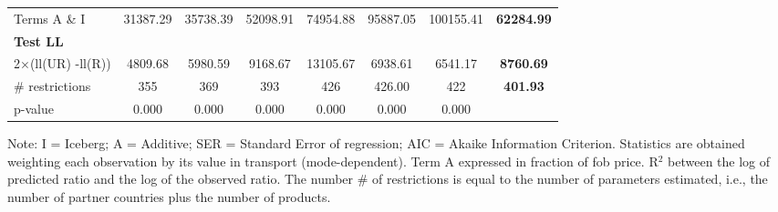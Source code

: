 \documentclass[a4paper,11pt]{article}
\begin{document}
\begin{table}[htbp]
\begin{center}
\begin{tabular}{lccccccc}
Terms A \& I & 31387.29 & 35738.39 & 52098.91 & 74954.88 & \multicolumn{1}{c}{95887.05} & \multicolumn{1}{c}{100155.41} & \multicolumn{1}{c}{\textbf{62284.99}} \\
\textbf{Test LL} &       &       &       &       & \multicolumn{1}{c}{} &       &  \\
2$\times$(ll(UR) -ll(R)) & 4809.68 & 5980.59 & 9168.67 & 13105.67 & \multicolumn{1}{c}{6938.61} & \multicolumn{1}{c}{6541.17} & \multicolumn{1}{c}{\textbf{8760.69}} \\
\# restrictions  & 355   & 369   & 393   & 426   & \multicolumn{1}{c}{426.00} & \multicolumn{1}{c}{422} & \multicolumn{1}{c}{\textbf{401.93}} \\
p-value & 0.000 & 0.000 & 0.000 & 0.000 & \multicolumn{1}{c}{0.000} & \multicolumn{1}{c}{0.000} & \multicolumn{1}{c}{\textbf{}} \\


\hline\hline

    \end{tabular}%
    \end{center}
  \label{tab:good_fit_air}%
  \tiny{Note: I = Iceberg; A = Additive; SER = Standard Error of regression; AIC = Akaike Information Criterion. Statistics are obtained weighting each observation by its value in transport (mode-dependent). Term A expressed in fraction of fob price. R$^{2}$ between the log of predicted ratio and the log of the observed ratio. The number \# of restrictions is equal to the number of parameters estimated, i.e., the number of partner countries plus the number of products.}
\end{table}%
\end{document}
